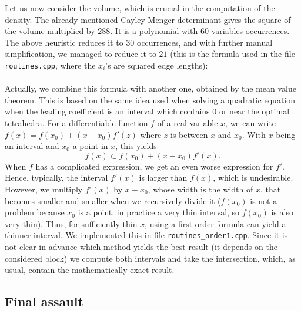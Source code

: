 \documentclass[11pt]{article}
\begin{document}
Let us now consider the volume, which is crucial in the computation of the density.
The already mentioned Cayley-Menger determinant gives the square of the volume multiplied by $288$.
It is a polynomial with $60$ variables occurrences.
The above heuristic reduces it to $30$ occurrences, and with further manual simplification, we managed to reduce it to $21$ (this is the formula used in the file \verb+routines.cpp+, where the $x_i$'s are squared edge lengths):\\

\noindent{}\\

Actually, we combine this formula with another one, obtained by the mean value theorem.
This is based on the same idea used when solving a quadratic equation when the leading coefficient is an interval which contains $0$ or near the optimal tetrahedra.
For a differentiable function $f$ of a real variable $x$, we can write $f(x)=f(x_0)+(x-x_0)f'(z)$ where $z$ is between $x$ and $x_0$.
With $x$ being an interval and $x_0$ a point in $x$, this yields
\[
f(x)\subset f(x_0)+(x-x_0)f'(x).
\]
When $f$ has a complicated expression, we get an even worse expression for $f'$.
Hence, typically, the interval $f'(x)$ is larger than $f(x)$, which is undesirable.
However, we multiply $f'(x)$ by $x-x_0$, whose width is the width of $x$, that becomes smaller and smaller when we recursively divide it ($f(x_0)$ is not a problem because $x_0$ is a point, in practice a very thin interval, so $f(x_0)$ is also very thin).
Thus, for sufficiently thin $x$, using a first order formula can yield a thinner interval.
We implemented this in file \verb+routines_order1.cpp+.
Since it is not clear in advance which method yields the best result (it depends on the considered block) we compute both intervals and take the intersection, which, as usual, contain the mathematically exact result.



\subsection{Final assault}
\label{sec:final}
\end{document}

